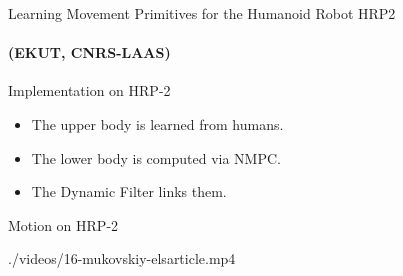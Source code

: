 
\begin{frame}{Learning Movement Primitives for the Humanoid Robot HRP2}
  \framesubtitle{(EKUT, CNRS-LAAS)}
  \begin{center}
    \scalebox{0.7}{}
  \end{center}
%  
\end{frame}

\begin{frame}{Implementation on HRP-2}
  \begin{center}
    \scalebox{0.7}{}
  \end{center}
%  
  \begin{itemize}
    \item The upper body is learned from humans.
    \item The lower body is computed via NMPC.
    \item The Dynamic Filter links them.
  \end{itemize}
\end{frame}

\begin{frame}{Motion on HRP-2}
  \begin{center}
    {./videos/16-mukovskiy-elsarticle.mp4}
  \end{center}
\end{frame}


